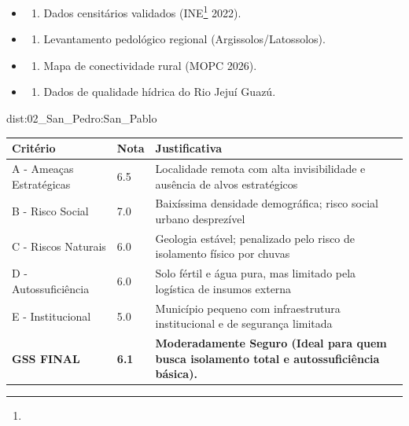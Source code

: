 {\begin{itemize}
\tightlist
\item
  \begin{enumerate}
  \def\labelenumi{\arabic{enumi})}
  \tightlist
  \item
    Dados censitários validados (INE\footnote{\fineINE} 2022).
  \end{enumerate}
\item
  \begin{enumerate}
  \def\labelenumi{\arabic{enumi})}
  \setcounter{enumi}{1}
  \tightlist
  \item
    Levantamento pedológico regional (Argissolos/\allowbreak Latossolos).
  \end{enumerate}
\item
  \begin{enumerate}
  \def\labelenumi{\arabic{enumi})}
  \setcounter{enumi}{2}
  \tightlist
  \item
    Mapa de conectividade rural (MOPC 2026).
  \end{enumerate}
\item
  \begin{enumerate}
  \def\labelenumi{\arabic{enumi})}
  \setcounter{enumi}{3}
  \tightlist
  \item
    Dados de qualidade hídrica do Rio Jejuí Guazú.
  \end{enumerate}
\end{itemize}}{dist:02_San_Pedro:San_Pablo}
\begin{table}[ht!]
\small \begin{tabular}{p{3.0cm}p{0.8cm}p{6.0cm}} \toprule
\textbf{Critério} & \textbf{Nota} & \textbf{Justificativa} \\ \midrule
A - Ameaças Estratégicas & 6.5 & Localidade remota com alta invisibilidade e ausência de alvos estratégicos \\
B - Risco Social & 7.0 & Baixíssima densidade demográfica; risco social urbano desprezível \\
C - Riscos Naturais & 6.0 & Geologia estável; penalizado pelo risco de isolamento físico por chuvas \\
D - Autossuficiência & 6.0 & Solo fértil e água pura, mas limitado pela logística de insumos externa \\
E - Institucional & 5.0 & Município pequeno com infraestrutura institucional e de segurança limitada \\
\midrule \textbf{GSS FINAL} & \textbf{6.1} & \textbf{Moderadamente Seguro (Ideal para quem busca isolamento total e autossuficiência básica).} \\ \bottomrule \end{tabular}
\end{table}
